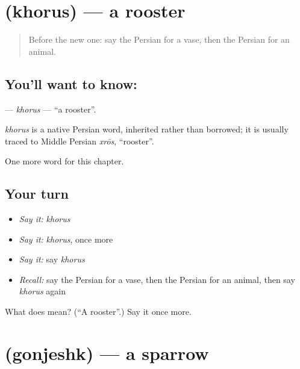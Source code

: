 \section[\texorpdfstring{\fa{خروس} (khorus)}{خروس (khorus)}]{ (khorus) — a rooster}

\label{lesson:FA-C171-khorus}



\begin{quote}
Before the new one: say the Persian for a vase, then the Persian for an animal.
\end{quote}

\subsection*{You'll want to know: }
\textbf{} — \emph{khorus} — \textquotedblleft{}a rooster\textquotedblright{}.

\begin{cousinweb}
\emph{khorus} is a native Persian word, inherited rather than borrowed; it is usually traced to Middle Persian \emph{xrōs}, \textquotedblleft{}rooster\textquotedblright{}.
\end{cousinweb}

\begin{grammarlens}[title={What you've built}]
One more word for this chapter.
\end{grammarlens}

\subsection*{Your turn}
\begin{itemize}
\raggedright
  \item \emph{Say it:} \emph{khorus}
  \item \emph{Say it:} \emph{khorus}, once more
  \item \emph{Say it:} say \emph{khorus}
  \item \emph{Recall:} say the Persian for a vase, then the Persian for an animal, then say \emph{khorus} again
\end{itemize}

\begin{tcolorbox}[breakable,colback=teal!4,colframe=teal!35!black,title={Before you move on}]
What does  mean? (\textquotedblleft{}A rooster\textquotedblright{}.) Say it once more.
\end{tcolorbox}
\section[\texorpdfstring{\fa{گنجشک} (gonjeshk)}{گنجشک (gonjeshk)}]{ (gonjeshk) — a sparrow}

